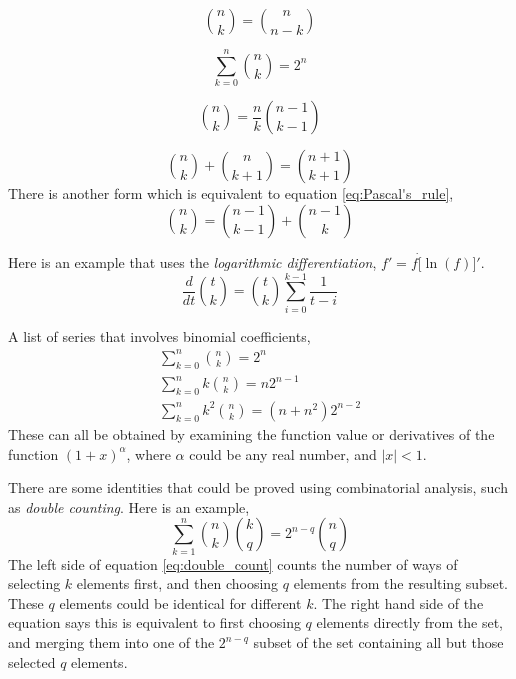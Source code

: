\begin{equation}
	{n \choose k} = {n \choose n-k}
\end{equation}

\begin{equation}\label{eq:subset_count}
	\sum^n_{k=0} {n \choose k} = 2^n
\end{equation}

\begin{equation}
	{n \choose k} = \frac{n}{k}{n-1 \choose k-1}
\end{equation}

\begin{equation}\label{eq:Pascal's_rule}
	{n \choose k} + {n \choose k+1} = {n+1 \choose k+1}
\end{equation}
There is another form which is equivalent to equation \ref{eq:Pascal's_rule},
\begin{equation}
	{n \choose k} = {n-1 \choose k-1} + {n-1 \choose k}
\end{equation}

\noindent Here is an example that uses the {\em{logarithmic differentiation}}, $f' = f \dot [\ln(f)]'$.
\begin{equation}
	\frac{d}{dt} {t \choose k} = {t \choose k} \sum^{k-1}_{i=0} \frac{1}{t-i}
\end{equation}

\noindent A list of series that involves binomial coefficients,
\begin{eqnarray}
	\sum^n_{k=0} {n \choose k} = 2^n \\
	\sum^n_{k=0} k {n \choose k} = n 2^{n-1} \\
	\sum^n_{k=0} k^2 {n \choose k} = (n+n^2) 2^{n-2}
\end{eqnarray}
These can all be obtained by examining the function value or derivatives of the function $(1+x)^\alpha$, where $\alpha$ could be any real number, and $|x| < 1$.

There are some identities that could be proved using combinatorial analysis, such as {\em{double counting}}. Here is an example,
\begin{equation}\label{eq:double_count}
	\sum^n_{k=1} {n \choose k} {k \choose q} = 2^{n-q} {n \choose q}
\end{equation}
The left side of equation \ref{eq:double_count} counts the number of ways of selecting $k$ elements first, and then choosing $q$ elements from the resulting subset. These $q$ elements could be identical for different $k$. The right hand side of the equation says this is equivalent to first choosing $q$ elements directly from the set, and merging them into one of the $2^{n-q}$ subset of the set containing all but those selected $q$ elements.

